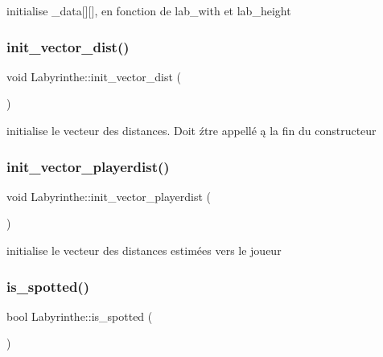 initialise \+\_\+data\mbox{[}\mbox{]}\mbox{[}\mbox{]}, en fonction de lab\+\_\+with et lab\+\_\+height 

\mbox{\label{classLabyrinthe_aabe4e77af2b2e156608741a0b08aabdc}} 
\subsubsection{\texorpdfstring{init\+\_\+vector\+\_\+dist()}{init\_vector\_dist()}}
{\footnotesize\ttfamily void Labyrinthe\+::init\+\_\+vector\+\_\+dist (\begin{DoxyParamCaption}{ }\end{DoxyParamCaption})\hspace{0.3cm}{\ttfamily [private]}}



initialise le vecteur des distances. Doit źtre appellé ą la fin du constructeur 

\mbox{\label{classLabyrinthe_a39850e108317404081a0dfe09a064975}} 
\subsubsection{\texorpdfstring{init\+\_\+vector\+\_\+playerdist()}{init\_vector\_playerdist()}}
{\footnotesize\ttfamily void Labyrinthe\+::init\+\_\+vector\+\_\+playerdist (\begin{DoxyParamCaption}{ }\end{DoxyParamCaption})\hspace{0.3cm}{\ttfamily [private]}}



initialise le vecteur des distances estimées vers le joueur 

\mbox{\label{classLabyrinthe_abee287932a7d9e1088224d0564d39d46}} 
\subsubsection{\texorpdfstring{is\+\_\+spotted()}{is\_spotted()}}
{\footnotesize\ttfamily bool Labyrinthe\+::is\+\_\+spotted (\begin{DoxyParamCaption}{ }\end{DoxyParamCaption})\hspace{0.3cm}{\ttfamily [inline]}}



